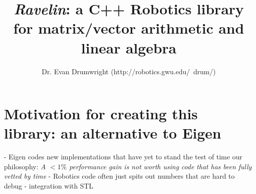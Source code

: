 \documentclass[11pt, letterpaper]{article}
\begin{document}
\singlespacing
\noindent

\title{\emph{Ravelin}: a C++ Robotics library for matrix/vector arithmetic and linear algebra}
\author{Dr. Evan Drumwright (http://robotics.gwu.edu/~drum/)}
\newline
\noindent

\section{Motivation for creating this library: an alternative to Eigen}
- Eigen codes new implementations that have yet to stand the test of time
  our philosophy: \emph{A $< 1\%$ performance gain is not worth using
  code that has been fully vetted by time}
- Robotics code often just spits out numbers that are hard to debug
- integration with STL
\end{document}
